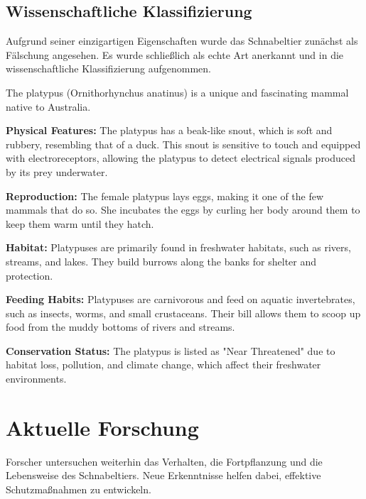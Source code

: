 \documentclass{article}
\begin{document}
        \subsection{Wissenschaftliche Klassifizierung}
        Aufgrund seiner einzigartigen Eigenschaften wurde das Schnabeltier zunächst als Fälschung angesehen. Es wurde schließlich als echte Art anerkannt und in die wissenschaftliche Klassifizierung aufgenommen.

            \begin{customEnvironment}
                The platypus (Ornithorhynchus anatinus) is a unique and fascinating mammal native to Australia.

                \textbf{Physical Features:}
                The platypus has a beak-like snout, which is soft and rubbery, resembling that of a duck. This snout is sensitive to touch and equipped with electroreceptors, allowing the platypus to detect electrical signals produced by its prey underwater.

                \textbf{Reproduction:}
                The female platypus lays eggs, making it one of the few mammals that do so. She incubates the eggs by curling her body around them to keep them warm until they hatch.
                \newline

                \textbf{Habitat:}
                 Platypuses are primarily found in freshwater habitats, such as rivers, streams, and lakes. They build burrows along the banks for shelter and protection.

                 \textbf{Feeding Habits:}
                 Platypuses are carnivorous and feed on aquatic invertebrates, such as insects, worms, and small crustaceans. Their bill allows them to scoop up food from the muddy bottoms of rivers and streams.

                 \textbf{Conservation Status:}
                 The platypus is listed as "Near Threatened" due to habitat loss, pollution, and climate change, which affect their freshwater environments.
            \end{customEnvironment}

    \section{Aktuelle Forschung}
    Forscher untersuchen weiterhin das Verhalten, die Fortpflanzung und die Lebensweise des Schnabeltiers. Neue Erkenntnisse helfen dabei, effektive Schutzmaßnahmen zu entwickeln.
\end{document}
